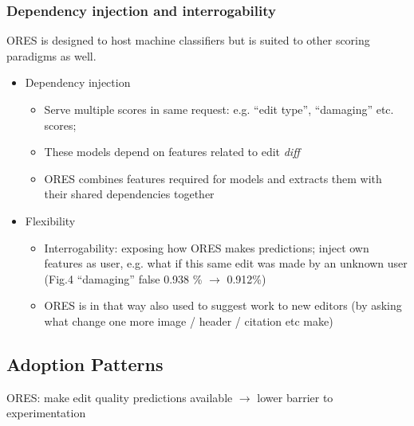\documentclass[12pt,a4paper]{article}
\begin{document}
\subsubsection{Dependency injection and interrogability}
ORES is designed to host machine classifiers but is suited to other scoring paradigms as well.
\begin{itemize}
\item Dependency injection
\begin{itemize}
\item Serve multiple scores in same request: e.g. ``edit type'', ``damaging'' etc. scores;
\item These models depend on features related to edit \textit{diff}
\item ORES combines features required for models and extracts them with their shared dependencies together
\end{itemize}
\item Flexibility
\begin{itemize}
\item Interrogability: exposing how ORES makes predictions; inject own features as user, e.g. what if this same edit was made by an unknown user (Fig.4 ``damaging'' false 0.938 \% \(\rightarrow\) 0.912\%)
\item ORES is in that way also used to suggest work to new editors (by asking what change one more image / header / citation etc make)
\end{itemize}
\end{itemize}
\subsection{Adoption Patterns}
ORES: make edit quality predictions available \(\rightarrow\) lower barrier to experimentation
\end{document}
